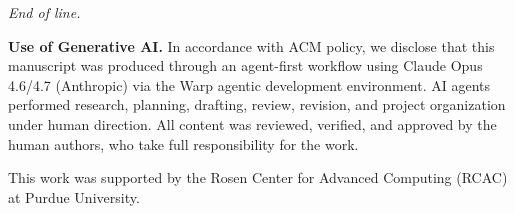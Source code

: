 \documentclass[sigconf]{acmart}
\begin{document}
\emph{End of line.}

\begin{acks}
\textbf{Use of Generative AI.}
In accordance with ACM policy, we disclose that this manuscript was produced through an agent-first workflow
using Claude Opus 4.6/4.7 (Anthropic) via the Warp agentic development environment.
AI agents performed research, planning, drafting, review, revision, and project organization under human direction.
All content was reviewed, verified, and approved by the human authors, who take full responsibility for the work.

This work was supported by the Rosen Center for Advanced Computing (RCAC) at Purdue University.
\end{acks}



\end{document}
